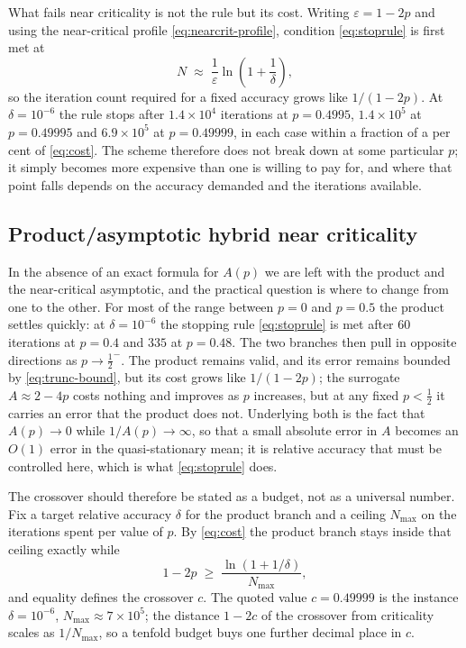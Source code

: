 \documentclass[11pt]{article}
\begin{document}
What fails near criticality is not the rule but its cost. Writing $\varepsilon=1-2p$ and
using the near-critical profile \eqref{eq:nearcrit-profile}, condition
\eqref{eq:stoprule} is first met at
\begin{equation}
N\;\approx\;\frac{1}{\varepsilon}\ln\!\left(1+\frac{1}{\delta}\right),
\label{eq:cost}
\end{equation}
so the iteration count required for a fixed accuracy grows like $1/(1-2p)$. At
$\delta=10^{-6}$ the rule stops after $1.4\times10^{4}$ iterations at
$p=0.4995$, $1.4\times10^{5}$ at $p=0.49995$ and $6.9\times10^{5}$ at
$p=0.49999$, in each case within a fraction of a per cent of \eqref{eq:cost}.
The scheme therefore does not break down at some particular $p$; it simply becomes
more expensive than one is willing to pay for, and where that point falls depends
on the accuracy demanded and the iterations available.

\subsection{Product/asymptotic hybrid near criticality}


In the absence of an exact formula for $A(p)$ we are left with the product and the
near-critical asymptotic, and the practical question is where to change from one to
the other. For most of the range between $p=0$ and $p=0.5$ the product settles
quickly: at $\delta=10^{-6}$ the stopping rule \eqref{eq:stoprule} is met after $60$
iterations at $p=0.4$ and $335$ at $p=0.48$. The two branches then pull in opposite
directions as $p\to\tfrac12^-$. The product remains valid, and its error remains
bounded by \eqref{eq:trunc-bound}, but its cost grows like $1/(1-2p)$; the
surrogate $A\approx2-4p$ costs nothing and improves as $p$ increases, but at any
fixed $p<\tfrac12$ it carries an error that the product does not. Underlying both
is the fact that $A(p)\to0$ while $1/A(p)\to\infty$, so that a small absolute error
in $A$ becomes an $O(1)$ error in the quasi-stationary mean; it is relative
accuracy that must be controlled here, which is what \eqref{eq:stoprule} does.

The crossover should therefore be stated as a budget, not as a universal number.
Fix a target relative accuracy $\delta$ for the product branch and a ceiling
$N_{\max}$ on the iterations spent per value of $p$. By \eqref{eq:cost} the product
branch stays inside that ceiling exactly while
\begin{equation}
1-2p\;\ge\;\frac{\ln\!\left(1+1/\delta\right)}{N_{\max}},
\label{eq:crossover}
\end{equation}
and equality defines the crossover $c$. The quoted value $c=0.49999$ is the
instance $\delta=10^{-6}$, $N_{\max}\approx7\times10^{5}$; the distance $1-2c$ of
the crossover from criticality scales as $1/N_{\max}$, so a tenfold budget buys one
further decimal place in $c$.
\end{document}
